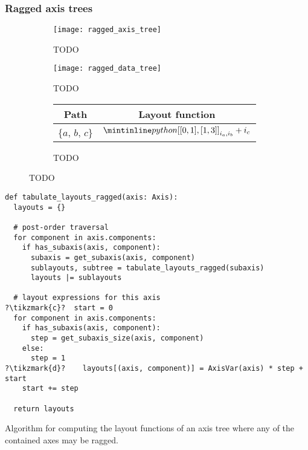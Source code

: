 \documentclass[thesis]{subfiles}
\begin{document}
\subsubsection{Ragged axis trees}
\label{sec:layout_alg_ragged}

\begin{figure}
  \centering
  \begin{subfigure}{.3\textwidth}
    \centering
    \texttt{[image: ragged\_axis\_tree]}
    \caption{TODO}
    \label{fig:ragged_axis_tree}
  \end{subfigure}
  \begin{subfigure}{.58\textwidth}
    \centering
    \texttt{[image: ragged\_data\_tree]}
    \caption{TODO}
    \label{fig:ragged_data_tree}
  \end{subfigure}

  \vspace{1em}

  \begin{subfigure}{\textwidth}
    \centering
    \begin{tabular}{|c|c|}
      \hline
      \textbf{Path} & \textbf{Layout function} \\
      \hline
      \{$a$, $b$, $c$\} & $\pycode{[[0, 1], [1, 3]]}_{i_a,i_b} + i_c$ \\
      \hline
    \end{tabular}
    \caption{TODO}
    \label{fig:ragged_layouts}
  \end{subfigure}
  \caption{TODO}
  \label{fig:ragged_axis_tree_all}
\end{figure}

\begin{algorithm}
  \begin{verbatim}
def tabulate_layouts_ragged(axis: Axis):
  layouts = {}

  # post-order traversal
  for component in axis.components:
    if has_subaxis(axis, component): 
      subaxis = get_subaxis(axis, component)
      sublayouts, subtree = tabulate_layouts_ragged(subaxis)
      layouts |= sublayouts

  # layout expressions for this axis
?\tikzmark{c}?  start = 0
  for component in axis.components:
    if has_subaxis(axis, component):
      step = get_subaxis_size(axis, component)
    else:
      step = 1
?\tikzmark{d}?    layouts[(axis, component)] = AxisVar(axis) * step + start
    start += step

  return layouts
  \end{verbatim}

  \caption{
    Algorithm for computing the layout functions of an axis tree where any of the contained axes may be ragged.
  }
  \label{alg:tabulate_layouts_ragged}
\end{algorithm}
\end{document}
